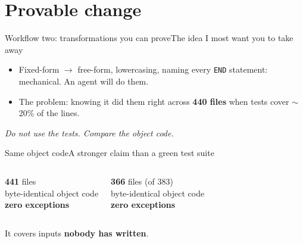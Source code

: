 \documentclass[aspectratio=169]{beamer}
\begin{document}
\section{Provable change}

\begin{frame}{Workflow two: transformations you can prove}{The idea I most want you to take away}
  \begin{itemize}\setlength\itemsep{5pt}
    \item Fixed-form $\to$ free-form, lowercasing, naming every \texttt{END} statement: mechanical. An agent will do them.
    \item The problem: knowing it did them right across \textbf{440 files} when tests cover $\sim$20\% of the lines.
  \end{itemize}
  \vspace{.2em}
  \centering
  \vspace{.3em}

  \emph{Do not use the tests. Compare the object code.}
\end{frame}

\begin{frame}{Same object code}{A stronger claim than a green test suite}
  \begin{columns}[T,onlytextwidth]
      \begin{cookiecard}[title=Lowercasing pass]
        \centering
        {\Huge\textbf{441}} files\\
        byte-identical object code\\
        \textbf{zero exceptions}
      \end{cookiecard}
      \begin{cookiecard}[title={Naming 7,506 END statements}]
        \centering
        {\Huge\textbf{366}} files (of 383)\\
        byte-identical object code\\
        \textbf{zero exceptions}
      \end{cookiecard}
  \end{columns}
  \vspace{.4em}
  \centering
  It covers inputs \textbf{nobody has written}.
\end{frame}
\end{document}
